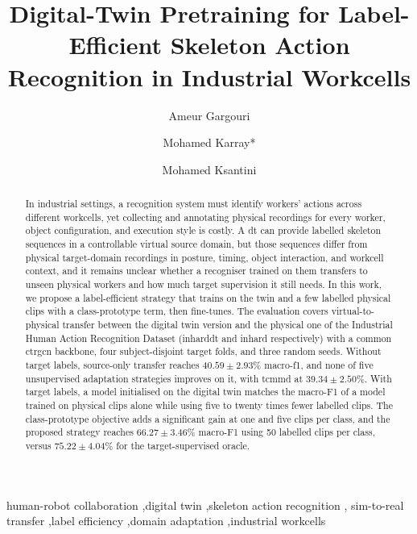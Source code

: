 \documentclass[3p,times,procedia]{elsarticle}
\begin{document}
\begin{frontmatter}

  \title{Digital-Twin Pretraining for Label-Efficient Skeleton Action Recognition in Industrial Workcells}

  \author[a,b]{Ameur Gargouri}
  \author[b]{Mohamed Karray*}
  \author[a]{Mohamed Ksantini}

  \address[a]{ATISP Lab, ENET'Com, University of Sfax, Sfax, Tunisia}
  \address[b]{ESME Research Lab, Ivry-sur-Seine, France}

  \begin{abstract}
    In industrial settings, a recognition system must identify workers' actions
    across different workcells, yet collecting and annotating physical recordings
    for every worker, object configuration, and execution style is costly. A
    \ac{dt} can provide labelled skeleton sequences in a controllable virtual
    source domain, but those sequences differ from physical target-domain
    recordings in posture, timing, object interaction, and workcell context, and
    it remains unclear whether a recogniser trained on them transfers to unseen
    physical workers and how much target supervision it still needs. In this
    work, we propose a label-efficient strategy that trains on the twin and a few
    labelled physical clips with a class-prototype term, then fine-tunes. The
    evaluation covers virtual-to-physical transfer between the digital twin version and
    the physical one of the Industrial Human Action Recognition Dataset (\acs{inharddt} and \acs{inhard} respectively) with a common \ac{ctrgcn} backbone, four
    subject-disjoint target folds, and three random seeds. Without target labels,
    source-only transfer reaches $40.59\pm2.93\%$ macro-\ac{f1}, and none of five
    unsupervised adaptation strategies improves on it, with \ac{tcmmd} at
    $39.34\pm2.50\%$. With target labels, a model initialised
    on the digital twin matches the macro-F1 of a model trained on physical clips
    alone while using five to twenty times fewer labelled clips. The
    class-prototype objective adds a significant gain at one and five clips per
    class, and the proposed strategy reaches
    $66.27\pm3.46\%$ macro-F1 using 50 labelled clips per class, versus
    $75.22\pm4.04\%$ for the target-supervised oracle.
  \end{abstract}

  \begin{keyword}
    human-robot collaboration \sep digital twin \sep skeleton action recognition \sep
    sim-to-real transfer \sep label efficiency \sep domain adaptation \sep industrial
    workcells
  \end{keyword}
\end{frontmatter}
\acresetall
\end{document}
